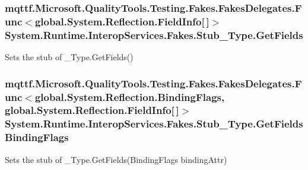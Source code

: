 \hypertarget{class_system_1_1_runtime_1_1_interop_services_1_1_fakes_1_1_stub___type_a0cd599523ba39075e0f8fa3d16a4f232}{
\subsubsection[{Get\-Fields}]{\setlength{\rightskip}{0pt plus 5cm}mqttf.\-Microsoft.\-Quality\-Tools.\-Testing.\-Fakes.\-Fakes\-Delegates.\-Func$<$global.\-System.\-Reflection.\-Field\-Info\mbox{[}$\,$\mbox{]}$>$ System.\-Runtime.\-Interop\-Services.\-Fakes.\-Stub\-\_\-\-Type.\-Get\-Fields}}\label{class_system_1_1_runtime_1_1_interop_services_1_1_fakes_1_1_stub___type_a0cd599523ba39075e0f8fa3d16a4f232}


Sets the stub of \-\_\-\-Type.\-Get\-Fields()

\hypertarget{class_system_1_1_runtime_1_1_interop_services_1_1_fakes_1_1_stub___type_a8c565f626aff4b4ddb6e2a543b511b7e}{
\subsubsection[{Get\-Fields\-Binding\-Flags}]{\setlength{\rightskip}{0pt plus 5cm}mqttf.\-Microsoft.\-Quality\-Tools.\-Testing.\-Fakes.\-Fakes\-Delegates.\-Func$<$global.\-System.\-Reflection.\-Binding\-Flags, global.\-System.\-Reflection.\-Field\-Info\mbox{[}$\,$\mbox{]}$>$ System.\-Runtime.\-Interop\-Services.\-Fakes.\-Stub\-\_\-\-Type.\-Get\-Fields\-Binding\-Flags}}\label{class_system_1_1_runtime_1_1_interop_services_1_1_fakes_1_1_stub___type_a8c565f626aff4b4ddb6e2a543b511b7e}


Sets the stub of \-\_\-\-Type.\-Get\-Fields(\-Binding\-Flags binding\-Attr)

